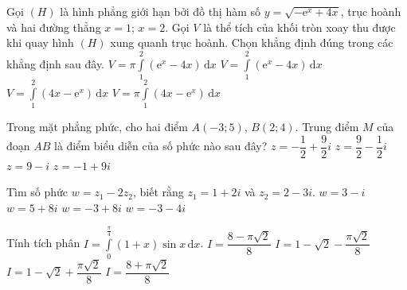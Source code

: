 \begin{ex}%
	Gọi $(H)$ là hình phẳng giới hạn bởi đồ thị hàm số $y=\sqrt{-\mathrm{e}^x+4x}$, trục hoành và hai đường thẳng $x=1$; $x=2$. Gọi $V$ là thể tích của khối tròn xoay thu được khi quay hình $(H)$ xung quanh trục hoành. Chọn khẳng định đúng trong các khẳng định sau đây.
	\choice
	{$V=\pi \displaystyle\int\limits_1^2 (\mathrm{e}^x-4x)\mathrm{\,d}x$}
	{$V=\displaystyle\int\limits_1^2 (\mathrm{e}^x-4x)\mathrm{\,d}x$}
	{$V=\displaystyle\int\limits_1^2 (4x-\mathrm{e}^x)\mathrm{\,d}x$}
	{\True $V=\pi \displaystyle\int\limits_1^2 (4x-\mathrm{e}^x)\mathrm{\,d}x$}
\end{ex}
\begin{ex}%
	Trong mặt phẳng phức, cho hai điểm $A(-3;5)$, $B(2;4)$. Trung điểm $M$ của đoạn $AB$ là điểm biểu diễn của số phức nào sau đây?
	\choice
	{\True $z=-\dfrac{1}{2}+\dfrac{9}{2}i$}
	{$z=\dfrac{9}{2}-\dfrac{1}{2}i$}
	{$z=9-i$}
	{$z=-1+9i$}
\end{ex}
\begin{ex}%
	Tìm số phức $w=z_1-2z_2$, biết rằng $z_1=1+2i$ và $z_2=2-3i$.
	\choice
	{$w=3-i$}
	{$w=5+8i$}
	{\True $w=-3+8i$}
	{$w=-3-4i$}
\end{ex}
\begin{ex}%
	Tính tích phân $I=\displaystyle\int\limits_0^{\tfrac{\pi}{4}} (1+x) \sin x\mathrm{\,d}x$.
	\choice
	{\True $I=\dfrac{8-\pi \sqrt{2}}{8}$}
	{$I=1-\sqrt{2}-\dfrac{\pi \sqrt{2}}{8}$}
	{$I=1-\sqrt{2}+\dfrac{\pi \sqrt{2}}{8}$}
	{$I=\dfrac{8+\pi \sqrt{2}}{8}$}
\end{ex}
